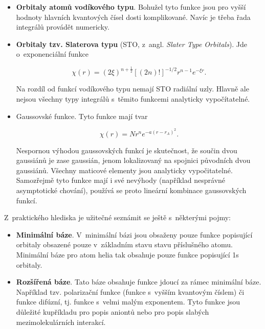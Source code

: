 \begin{itemize}
\item \textbf{Orbitaly atomů vodíkového typu}. Bohužel tyto funkce jsou pro vyšší hodnoty hlavních kvantových čísel dosti komplikované. Navíc je třeba řada integrálů provádět numericky.

\item \textbf{Orbitaly tzv. Slaterova typu} (STO, z~angl. \textit{Slater Type Orbitals}). Jde o~exponenciální funkce

\begin{equation}
\chi(r) = (2 \xi)^{n+\frac{1}{2}} \left[ (2n)! \right]^{-1/2} r^{n-1} e^{-\xi r}.
\label{rov:VE-56}
\end{equation}

\noindent Na rozdíl od funkcí vodíkového typu nemají STO radiální uzly. Hlavně ale nejsou všechny typy integrálů s~těmito funkcemi analyticky vypočítatelné. 

\item Gaussovské funkce. Tyto funkce mají tvar

\begin{equation}
\chi(r) = N r^n e^{-a(r-r_A)^2}.
\label{rov:VE-57}
\end{equation}

\noindent Nespornou výhodou gaussovských funkcí je skutečnost, že součin dvou gaussiánů je zase gaussián, jenom lokalizovaný na spojnici původních dvou gaussiánů. Všechny maticové elementy jsou analyticky vypočitatelné. Samozřejmě tyto funkce mají i své nevýhody (například nesprávné asymptotické chování), používá se proto lineární kombinace gaussovských funkcí.  

\end{itemize}


Z~praktického hlediska je užitečné seznámit se ještě s~některými pojmy:

\begin{itemize}
\item \textbf{Minimální báze}. V~minimální bázi jsou obsaženy pouze funkce popisující orbitaly obsazené pouze v~základním stavu stavu příslušného atomu. Minimální báze pro atom helia tak obsahuje pouze funkce popisující 1s orbitaly.

\item \textbf{Rozšířená báze}. Tato báze obsahuje funkce jdoucí za rámec minimální báze. Například tzv. polarizační funkce (funkce s~vyšším kvantovým číslem) či funkce difúzní, tj. funkce s~velmi malým exponentem. Tyto funkce jsou důležité kupříkladu pro popis aniontů nebo pro popis slabých mezimolekulárních interakcí. 
 
\end{itemize}

